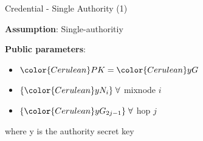 \begin{frame}{Credential - Single Authority (1)}
    \vspace{-5mm}
    \begin{center}
        \begin{figure}%
            \resizebox{0.8\linewidth}{!}{}
        \end{figure} 
        \textbf{Assumption}: {\color{Cerulean}Single-authoritiy}
    \end{center}

    \vfill
    \textbf{Public parameters}:
    \begin{itemize}
        \item  ${\color{Cerulean}PK} = {\color{Cerulean}y} G$
        \item $\{{\color{Cerulean}y} N_i\} \; \forall$ mixnode $i$
        \item $\{{\color{Cerulean}y} G_{2j-1}\} \; \forall$ hop $j$ 
    \end{itemize}\vfill
    where {\color{Cerulean}y} is the authority secret key

\end{frame}


